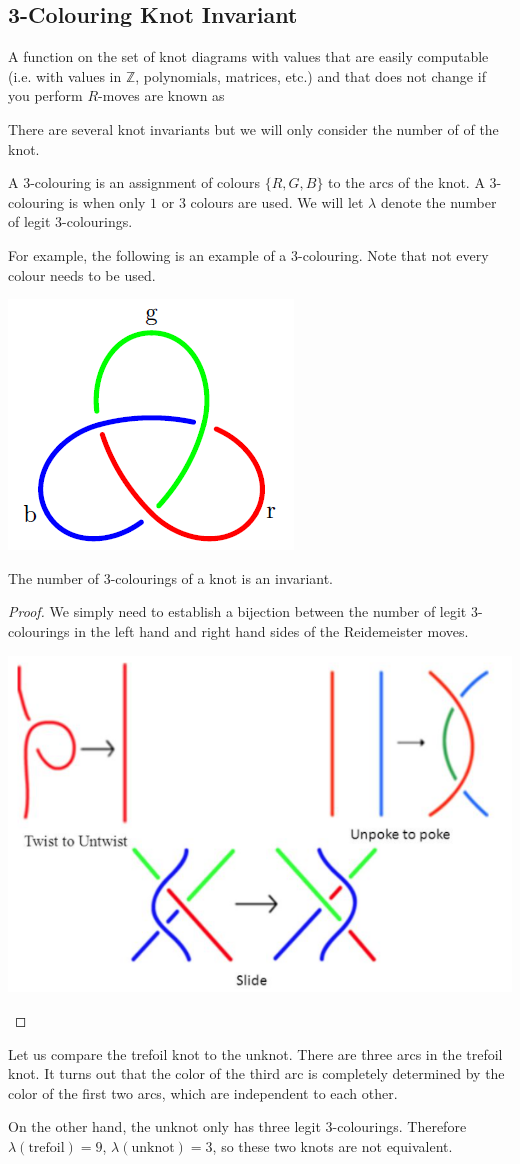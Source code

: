 \documentclass{article}
\begin{document}
\subsection{3-Colouring Knot Invariant}
\begin{definition}
    A function on the set of knot diagrams with values that are easily computable (i.e. with values in $\mathbb{Z}$, polynomials, matrices, etc.) and that does not change if you perform $R$-moves are known as 
\end{definition}
There are several knot invariants but we will only consider the number of  of the knot.
\begin{definition}
    A 3-colouring is an assignment of colours $\{R,G,B\}$ to the arcs of the knot. A  3-colouring is when only $1$ or $3$ colours are used. We will let $\lambda$ denote the number of legit 3-colourings.
\end{definition}
For example, the following is an example of a 3-colouring. Note that not every colour needs to be used.
\begin{center}
    \includegraphics[width=0.2\linewidth]{figures/trefoil_3color.png}
\end{center}
\begin{theorem}
        The number of 3-colourings of a knot is an invariant.
\end{theorem}
\begin{proof}
    We simply need to establish a bijection between the number of legit 3-colourings in the left hand and right hand sides of the Reidemeister moves.
    \begin{center}
        \includegraphics[width=0.4\linewidth]{figures/reidemeister_3coloring.png}
    \end{center}
    \vspace{-6mm}
\end{proof}
\begin{example}
    Let us compare the trefoil knot to the unknot. There are three arcs in the trefoil knot. It turns out that the color of the third arc is completely determined by the color of the first two arcs, which are independent to each other.
    \vspace{2mm}

    On the other hand, the unknot only has three legit 3-colourings. Therefore $\lambda(\text{trefoil}) = 9$, $\lambda(\text{unknot}) = 3$, so these two knots are not equivalent.
\end{example}
\end{document}
